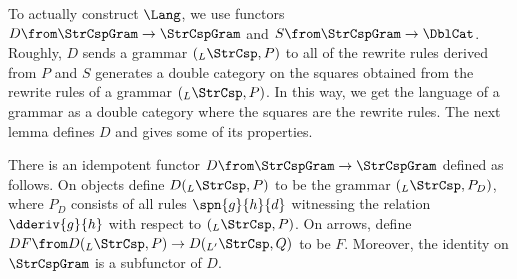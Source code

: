 \begin{example}
\begin{center}
  \end{center}
\end{example}

To actually construct $ \Lang $, we use functors
$ D \from \StrCspGram \to \StrCspGram $ and
$ S \from \StrCspGram \to \DblCat $. Roughly, $ D $ sends a
grammar $ ( _L \StrCsp , P ) $ to all of the rewrite rules
derived from $ P $ and $ S $ generates a double category on
the squares obtained from the rewrite rules of a grammar
$ ( _L \StrCsp , P ) $. In this way, we get the language of
a grammar as a double category where the squares are the
rewrite rules.  The next lemma defines $ D $ and gives some
of its properties.

\begin{lemma}
  There is an idempotent functor
  $ D \from \StrCspGram \to \StrCspGram $ defined as
  follows. On objects define $ D ( _{L}\StrCsp , P ) $ to be
  the grammar $ ( _{L} \StrCsp , P_D) $, where $ P_D $
  consists of all rules $ \spn{g}{h}{d} $ witnessing the
  relation $ \dderiv{g}{h} $ with respect to
  $ ( _{L}\StrCsp , P ) $. On arrows, define
  $ DF \from D( _{L}\StrCsp , P ) \to D( _{L'}\StrCsp , Q )
  $ to be $ F $.  Moreover, the identity on $ \StrCspGram $
  is a subfunctor of $ D $.
\end{lemma}

